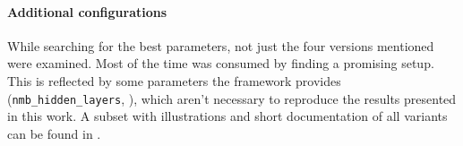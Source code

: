 \paragraph{Additional configurations}
While searching for the best parameters, not just the four versions mentioned were examined. Most of the time was consumed by finding a promising setup. This is reflected by some parameters the framework provides (\eg \texttt{nmb\_hidden\_layers}, ), which aren't necessary to reproduce the results presented in this work. A subset with illustrations and short documentation of all variants can be found in .


%


